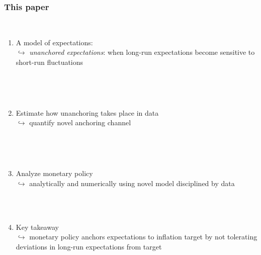 \documentclass[10pt]{beamer}
\begin{document}
\begin{frame}
	\frametitle{This paper}


\

	
	\begin{enumerate}
%	
%	

	\item A model of expectations:  \\
	$\hookrightarrow$ \emph{unanchored expectations}: when long-run expectations become sensitive to short-run fluctuations 	
	
	\
	
	\
	
	\item Estimate how unanchoring takes place in data \\
	$\hookrightarrow$ quantify novel anchoring channel
	
	\
	
	\
	
	\item Analyze monetary policy \\
	$\hookrightarrow$ analytically and numerically using novel model disciplined by data \\

        \
	
	\
	
	\item Key takeaway \\
	$\hookrightarrow$ monetary policy anchors expectations to inflation target by not tolerating deviations in long-run expectations from target \\

	\end{enumerate}
	\end{frame}
\end{document}
